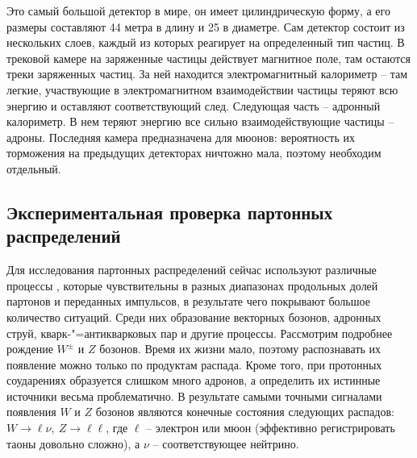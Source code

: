 \documentclass[12pt, a4paper]{article}
\begin{document}
Это самый большой детектор в мире, он имеет цилиндрическую форму, а его размеры составляют 44 метра в длину и 25 в диаметре. Сам детектор состоит из нескольких слоев, каждый из которых реагирует на определенный тип частиц. В трековой камере на заряженные частицы действует магнитное поле, там остаются треки заряженных частиц. За ней находится электромагнитный калориметр -- там легкие, участвующие в электромагнитном взаимодействии частицы теряют всю энергию и оставляют соответствующий след. Следующая часть -- адронный калориметр. В нем теряют энергию все сильно взаимодействующие частицы -- адроны. Последняя камера предназначена для мюонов: вероятность их торможения на предыдущих детекторах ничтожно мала, поэтому необходим отдельный. 

\subsection{Экспериментальная проверка партонных распределений}


Для исследования партонных распределений сейчас используют различные процессы \cite{pdf_det}, которые чувствительны в разных диапазонах продольных долей партонов и переданных импульсов, в результате чего покрывают большое количество ситуаций. 
Среди них образование векторных бозонов, адронных струй, {кварк-"=антикварковых} пар и другие процессы. Рассмотрим подробнее рождение $W^\pm$ и $Z$ бозонов. Время их жизни мало, поэтому распознавать их появление можно только по продуктам распада. Кроме того, при протонных соударениях образуется слишком много адронов, а определить их истинные источники весьма проблематично. В результате самыми точными сигналами появления $W$ и $Z$ бозонов являются конечные состояния следующих распадов: 
$W\rightarrow\ell\nu,\ Z\rightarrow\ell\ell$, где $\ell$ -- электрон или мюон (эффективно регистрировать таоны довольно сложно), а $\nu$ -- соответствующее нейтрино. 
\end{document}

